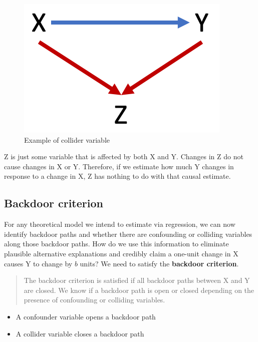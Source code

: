 \documentclass[
]{book}
\providecommand{\tightlist}{%
  \setlength{\itemsep}{0pt}\setlength{\parskip}{0pt}}
\begin{document}
\begin{figure}

{\centering \includegraphics[width=\textwidth]{images/dag_collide} 

}

\caption{Example of collider variable}\label{fig:dagcoll}
\end{figure}

Z is just some variable that is affected by both X and Y. Changes in Z do not cause changes in X or Y. Therefore, if we estimate how much Y changes in response to a change in X, Z has nothing to do with that causal estimate.

\hypertarget{backdoor-criterion}{%
\subsection{Backdoor criterion}\label{backdoor-criterion}}

For any theoretical model we intend to estimate via regression, we can now identify backdoor paths and whether there are confounding or colliding variables along those backdoor paths. How do we use this information to eliminate plausible alternative explanations and credibly claim a one-unit change in X causes Y to change by \(b\) units? We need to satisfy the \textbf{backdoor criterion}.

\begin{quote}
The backdoor criterion is satisfied if all backdoor paths between X and Y are closed. We know if a backdoor path is open or closed depending on the presence of confounding or colliding variables.
\end{quote}

\begin{itemize}
\tightlist
\item
  A confounder variable opens a backdoor path
\item
  A collider variable closes a backdoor path
\end{itemize}
\end{document}
